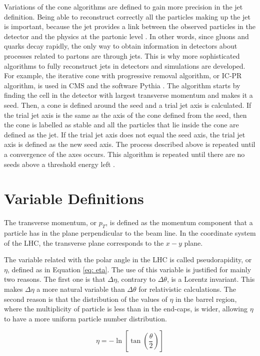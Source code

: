 Variations of the cone algorithms are defined to gain more precision in the jet definition. Being able to reconstruct correctly all the particles making up the jet is important, because the jet provides a link between the observed particles in the detector and the physics at the partonic level \cite{Jets}. In other words, since gluons and quarks decay rapidly, the only way to obtain information in detectors about processes related to partons are through jets. This is why more sophisticated algorithms to fully reconstruct jets in detectors and simulations are developed. For example, the iterative cone with progressive removal algorithm, or IC-PR algorithm, is used in CMS and the software Pythia \cite{Jets}. The algorithm starts by finding the cell in the detector with largest transverse momentum and makes it a seed. Then, a cone is defined around the seed and a trial jet axis is calculated. If the trial jet axis is the same as the axis of the cone defined from the seed, then the cone is labelled as stable and all the particles that lie inside the cone are defined as the jet. If the trial jet axis does not equal the seed axis, the trial jet axis is defined as the new seed axis. The process described above is repeated until a convergence of the axes occurs. This algorithm is repeated until there are no seeds above a threshold energy left \cite{Jets}.  


\section{Variable Definitions}

The transverse momentum, or $p_{T}$, is defined as the momentum component that a particle has in the plane perpendicular to the beam line. In the coordinate system of the LHC, the transverse plane corresponds to the $x-y$ plane.

The variable related with the polar angle in the LHC is called pseudorapidity, or $\eta$, defined as in Equation \ref{eq: eta}. The use of this variable is justified for mainly two reasons. The first one is that $\Delta \eta$, contrary to $\Delta \theta$, is a Lorentz invariant. This makes $\Delta \eta$ a more natural variable than $\Delta \theta$ for relativistic calculations. The second reason is that the distribution of the values of $\eta$ in the barrel region, where the multiplicity of particle is less than in the end-caps, is wider, allowing $\eta$ to have a more uniform particle number distribution.

\begin{equation}
 \eta = -\ln\left[\tan\left(\frac{\theta}{2}\right)\right]
 \label{eq: eta}
\end{equation}

